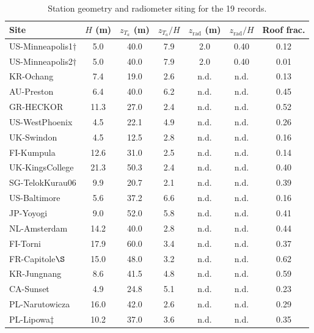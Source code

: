\begin{table}[!tbp]
\centering\footnotesize
\caption{Station geometry and radiometer siting for the 19 records.}
\label{tab:geom}
\setlength{\tabcolsep}{4pt}
\begin{tabular}{lcccccc}
\toprule
Site & $H$ (m) & $z_{T_a}$ (m) & $z_{T_a}/H$ & $z_{\mathrm{rad}}$ (m) & $z_{\mathrm{rad}}/H$ & Roof frac. \\
\midrule
US-Minneapolis1$\dagger$ & 5.0 & 40.0 & 7.9 & 2.0 & 0.40 & 0.12 \\
US-Minneapolis2$\dagger$ & 5.0 & 40.0 & 7.9 & 2.0 & 0.40 & 0.01 \\
KR-Ochang & 7.4 & 19.0 & 2.6 & n.d. & n.d. & 0.13 \\
AU-Preston & 6.4 & 40.0 & 6.2 & n.d. & n.d. & 0.45 \\
GR-HECKOR & 11.3 & 27.0 & 2.4 & n.d. & n.d. & 0.52 \\
US-WestPhoenix & 4.5 & 22.1 & 4.9 & n.d. & n.d. & 0.26 \\
UK-Swindon & 4.5 & 12.5 & 2.8 & n.d. & n.d. & 0.16 \\
FI-Kumpula & 12.6 & 31.0 & 2.5 & n.d. & n.d. & 0.14 \\
UK-KingsCollege & 21.3 & 50.3 & 2.4 & n.d. & n.d. & 0.40 \\
SG-TelokKurau06 & 9.9 & 20.7 & 2.1 & n.d. & n.d. & 0.39 \\
US-Baltimore & 5.6 & 37.2 & 6.6 & n.d. & n.d. & 0.16 \\
JP-Yoyogi & 9.0 & 52.0 & 5.8 & n.d. & n.d. & 0.41 \\
NL-Amsterdam & 14.2 & 40.0 & 2.8 & n.d. & n.d. & 0.44 \\
FI-Torni & 17.9 & 60.0 & 3.4 & n.d. & n.d. & 0.37 \\
FR-Capitole$\S$ & 15.0 & 48.0 & 3.2 & n.d. & n.d. & 0.62 \\
KR-Jungnang & 8.6 & 41.5 & 4.8 & n.d. & n.d. & 0.59 \\
CA-Sunset & 4.9 & 24.8 & 5.1 & n.d. & n.d. & 0.23 \\
PL-Narutowicza & 16.0 & 42.0 & 2.6 & n.d. & n.d. & 0.29 \\
PL-Lipowa$\ddagger$ & 10.2 & 37.0 & 3.6 & n.d. & n.d. & 0.35 \\
\bottomrule
\end{tabular}
\par{}
\end{table}
